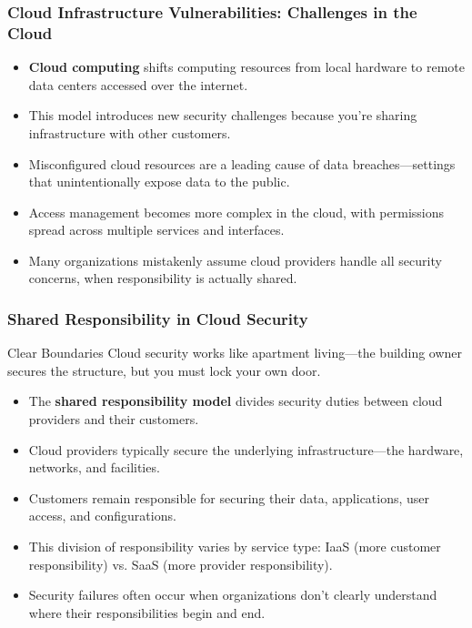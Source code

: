 \documentclass{beamer}
\begin{document}
\begin{frame}
    \frametitle{Cloud Infrastructure Vulnerabilities: Challenges in the Cloud}
    
    \begin{itemize}
        \item \textbf{Cloud computing} shifts computing resources from local hardware to remote data centers accessed over the internet.
        \item This model introduces new security challenges because you're sharing infrastructure with other customers.
        \item Misconfigured cloud resources are a leading cause of data breaches—settings that unintentionally expose data to the public.
        \item Access management becomes more complex in the cloud, with permissions spread across multiple services and interfaces.
        \item Many organizations mistakenly assume cloud providers handle all security concerns, when responsibility is actually shared.
    \end{itemize}
\end{frame}

\begin{frame}
    \frametitle{Shared Responsibility in Cloud Security}
    
    \begin{block}{Clear Boundaries}
        Cloud security works like apartment living—the building owner secures the structure, but you must lock your own door.
    \end{block}
    
    \begin{itemize}
        \item The \textbf{shared responsibility model} divides security duties between cloud providers and their customers.
        \item Cloud providers typically secure the underlying infrastructure—the hardware, networks, and facilities.
        \item Customers remain responsible for securing their data, applications, user access, and configurations.
        \item This division of responsibility varies by service type: IaaS (more customer responsibility) vs. SaaS (more provider responsibility).
        \item Security failures often occur when organizations don't clearly understand where their responsibilities begin and end.
    \end{itemize}
\end{frame}
\end{document}

